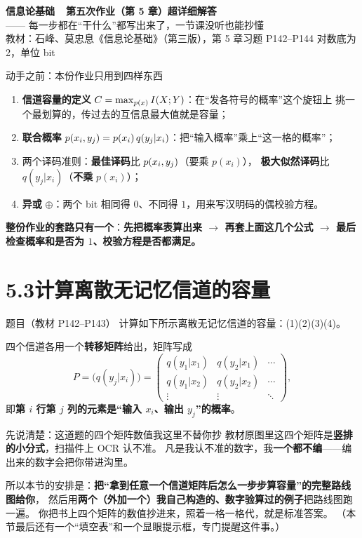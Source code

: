 \documentclass[11pt,a4paper]{ctexart}
\begin{document}
\begin{center}
{\LARGE\bfseries 信息论基础\ \ 第五次作业（第 5 章）超详细解答}\\[8pt]
{\large —— 每一步都在“干什么”都写出来了，一节课没听也能抄懂}\\[8pt]
{\small 教材：石峰、莫忠息《信息论基础》（第三版），第 5 章习题 P142--P144\quad
对数底为 2，单位 bit}
\end{center}

\begin{idea}{动手之前：本份作业只用到四样东西}
\begin{enumerate}[leftmargin=1.8em,itemsep=1pt,topsep=2pt]
  \item \textbf{信道容量的定义} $C=\max_{p(x)}I\!\left(X;Y\right)$：在“发各符号的概率”这个旋钮上
        挑一个最划算的，传过去的互信息最大值就是容量；
  \item \textbf{联合概率} $p\!\left(x_i,y_j\right)=p(x_i)\,q(y_j|x_i)$：把“输入概率”乘上“这一格的概率”；
  \item 两个译码准则：\textbf{最佳译码}比 $p\!\left(x_i,y_j\right)$（要乘 $p(x_i)$），
        \textbf{极大似然译码}比 $q(y_j|x_i)$（\textbf{不乘} $p(x_i)$）；
  \item \textbf{异或} $\oplus$：两个 bit 相同得 $0$、不同得 $1$，用来写汉明码的偶校验方程。
\end{enumerate}
\textbf{整份作业的套路只有一个}：\textbf{先把概率表算出来 $\to$ 再套上面这几个公式
$\to$ 最后检查概率和是否为 $1$、校验方程是否都满足。}
\end{idea}

\section{5.3\quad 计算离散无记忆信道的容量}

\begin{defbox}{题目（教材 P142--P143）}
计算如下所示离散无记忆信道的容量：(1)\quad(2)\quad(3)\quad(4)。

四个信道各用一个\textbf{转移矩阵}给出，矩阵写成
\[
P=\bigl(q(y_j|x_i)\bigr)=
\begin{pmatrix}
q(y_1|x_1)&q(y_2|x_1)&\cdots\\
q(y_1|x_2)&q(y_2|x_2)&\cdots\\
\vdots&\vdots&\ddots
\end{pmatrix},
\]
即\textbf{第 $i$ 行第 $j$ 列的元素是“输入 $x_i$、输出 $y_j$”的概率}。
\end{defbox}

\begin{qa}{先说清楚：这道题的四个矩阵数值我这里不替你抄}
教材原图里这四个矩阵是\textbf{竖排的小分式}，扫描件上 OCR 认不准。
凡是我认不准的数字，我\textbf{一个都不编}——编出来的数字会把你带进沟里。

所以本节的安排是：\textbf{把“拿到任意一个信道矩阵后怎么一步步算容量”的完整路线图给你}，
然后用\textbf{两个（外加一个）我自己构造的、数字验算过的例子}把路线图跑一遍。
你把书上四个矩阵的数值抄进来，照着一格一格代，就是标准答案。
（本节最后还有一个“填空表”和一个显眼提示框，专门提醒这件事。）
\end{qa}
\end{document}
